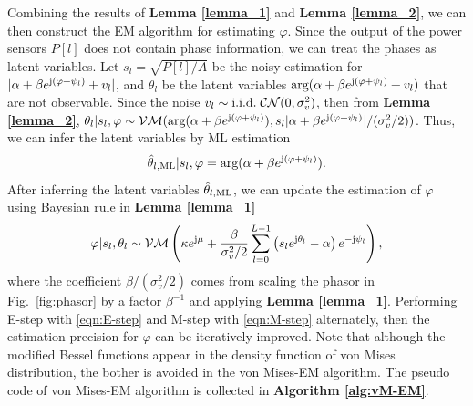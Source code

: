\documentclass[journal,twocolumn]{IEEEtran}
\theoremstyle{nonumberplain}
\def \arg {\text{arg}}
\def \CN {\mathcal{CN}}
\def \VM {\mathcal{VM}}
\begin{document}
    Combining the results of {\bf Lemma \ref{lemma_1}} and {\bf Lemma \ref{lemma_2}}, we can then construct the EM algorithm for estimating $\varphi$. Since the output of the power sensors $P[l]$ does not contain phase information, we can treat the phases as latent variables. Let $s_l = \sqrt{P[l]/A}$ be the noisy estimation for $|\alpha + \beta e^{{\rm j} (\varphi + \psi_l)} + v_l|$, and $\theta_l$ be the latent variables $\arg (\alpha + \beta e^{{\rm j} (\varphi + \psi_l)} + v_l)$ that are not observable. 
    Since the noise $v_l \sim {\rm i.i.d.}\;\CN(0, \sigma_v^2)$, then from {\bf Lemma \ref{lemma_2}}, $\theta_l | s_l, \varphi \sim \VM(\arg(\alpha + \beta e^{{\rm j} (\varphi + \psi_l)}), s_l |\alpha + \beta e^{{\rm j} (\varphi + \psi_l)}|/(\sigma_v^2/2))$. Thus, we can infer the latent variables by ML estimation 
    \begin{equation}
        \hat{\theta}_{l, {\rm ML}} | s_l, \varphi = \arg(\alpha + \beta e^{{\rm j} (\varphi + \psi_l)}).
        \label{eqn:E-step}
    \end{equation}
    After inferring the latent variables $\hat{\theta}_{l, {\rm ML}}$, we can update the estimation of $\varphi$ using Bayesian rule in {\bf Lemma \ref{lemma_1}}
    \begin{equation}
        \varphi | s_l, \theta_l \sim \VM\left( \kappa e^{{\rm j} \mu} + \frac{\beta}{\sigma_v^2/2}\sum_{l=0}^{L-1}{\left(s_l e^{{\rm j}\theta_l}-\alpha\right)e^{-{\rm j} \psi_l}}\right),
        \label{eqn:M-step}
    \end{equation}
    where the coefficient $\beta/(\sigma_v^2/2)$ comes from scaling the phasor in Fig.~\ref{fig:phasor} by a factor $\beta^{-1}$ and applying {\bf Lemma \ref{lemma_1}}.
    Performing E-step with \eqref{eqn:E-step} and M-step with \eqref{eqn:M-step} alternately, then the estimation precision for $\varphi$ can be iteratively improved. Note that although the modified Bessel functions appear in the density function of von Mises distribution, the bother is avoided in the von Mises-EM algorithm. The pseudo code of von Mises-EM algorithm is collected in {\bf Algorithm \ref{alg:vM-EM}}.
\end{document}
